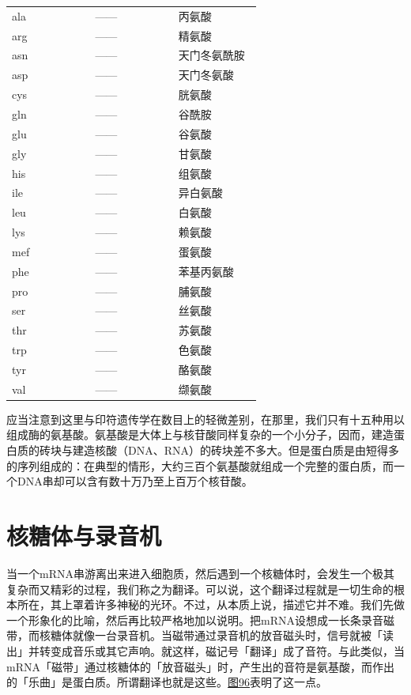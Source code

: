 \documentclass[
  12pt,
  twoside,
  openright,
  oldfontcommands,
]{memoir}
\begin{document}
\begin{longtable}[]{>{\raggedright\arraybackslash}p{0.313\linewidth} >{\raggedright\arraybackslash}p{0.313\linewidth} >{\raggedright\arraybackslash}p{0.313\linewidth}}
\toprule\noalign{}
\endhead
\bottomrule\noalign{}
\endlastfoot
ala & ------ & 丙氨酸 \\
arg & ------ & 精氨酸 \\
asn & ------ & 天门冬氨酰胺 \\
asp & ------ & 天门冬氨酸 \\
cys & ------ & 胱氨酸 \\
gln & ------ & 谷酰胺 \\
glu & ------ & 谷氨酸 \\
gly & ------ & 甘氨酸 \\
his & ------ & 组氨酸 \\
ile & ------ & 异白氨酸 \\
leu & ------ & 白氨酸 \\
lys & ------ & 赖氨酸 \\
mef & ------ & 蛋氨酸 \\
phe & ------ & 苯基丙氨酸 \\
pro & ------ & 脯氨酸 \\
ser & ------ & 丝氨酸 \\
thr & ------ & 苏氨酸 \\
trp & ------ & 色氨酸 \\
tyr & ------ & 酪氨酸 \\
val & ------ & 缬氨酸 \\
\end{longtable}

应当注意到这里与印符遗传学在数目上的轻微差别，在那里，我们只有十五种用以组成酶的氨基酸。氨基酸是大体上与核苷酸同样复杂的一个小分子，因而，建造蛋白质的砖块与建造核酸（DNA、RNA）的砖块差不多大。但是蛋白质是由短得多的序列组成的：在典型的情形，大约三百个氨基酸就组成一个完整的蛋白质，而一个DNA串却可以含有数十万乃至上百万个核苷酸。

\section{核糖体与录音机}

当一个mRNA串游离出来进入细胞质，然后遇到一个核糖体时，会发生一个极其复杂而又精彩的过程，我们称之为翻译。可以说，这个翻译过程就是一切生命的根本所在，其上罩着许多神秘的光环。不过，从本质上说，描述它并不难。我们先做一个形象化的比喻，然后再比较严格地加以说明。把mRNA设想成一长条录音磁带，而核糖体就像一台录音机。当磁带通过录音机的放音磁头时，信号就被「读出」并转变成音乐或其它声响。就这样，磁记号「翻译」成了音符。与此类似，当mRNA「磁带」通过核糖体的「放音磁头」时，产生出的音符是氨基酸，而作出的「乐曲」是蛋白质。所谓翻译也就是这些。\hyperref[fig:96]{图96}表明了这一点。
\end{document}
